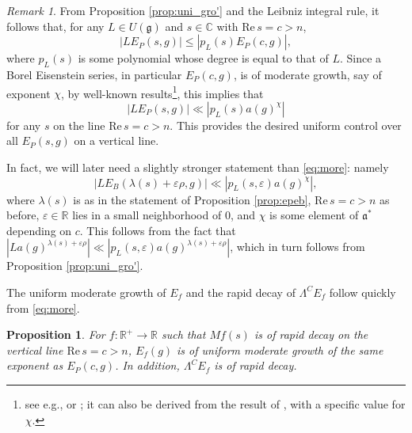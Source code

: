 \documentclass[11pt]{amsart}
\def\R{\mathbb{R}}
\newtheorem{proposition}[theorem]{Proposition}
\numberwithin{theorem}{section}
\numberwithin{equation}{section}
\theoremstyle{remark}
\newtheorem*{remark}{Remark}
\theoremstyle{definition}
\newcommand{\C}{\mathbb{C}}
\newcommand{\re}{\mathrm{Re}\,}
\newcommand{\ga}{\mathfrak{a}}
\newcommand{\Lg}{\mathfrak{g}}
\begin{document}
\begin{remark}
From Proposition \ref{prop:uni_gro'} and the Leibniz integral rule, it follows that, for any $L \in U(\Lg)$ and $s \in \C$ with $\re s = c > n$,
\begin{equation*}
|LE_P(s,g)| \leq |p_L(s)E_P(c,g)|,
\end{equation*}
where $p_L(s)$ is some polynomial whose degree is equal to that of $L$. Since a Borel Eisenstein series, in particular $E_P(c,g)$, is of moderate growth, say of exponent $\chi$, by well-known results\footnote{see e.g., \cite[I.2.17]{MW95} or \cite[Appendix A]{GMP17}; it can also be derived from the result of \cite{Kim23}, with a specific value for $\chi$.}, this implies that
\begin{equation}\label{eq:more}
|LE_P(s,g)| \ll |p_L(s)a(g)^\chi|
\end{equation}
for any $s$ on the line $\re s = c > n$. This provides the desired uniform control over all $E_P(s,g)$ on a vertical line.

In fact, we will later need a slightly stronger statement than \eqref{eq:more}: namely
\begin{equation}\label{eq:more2}
|LE_B(\lambda(s)+\varepsilon\rho,g)| \ll |p_L(s,\varepsilon)a(g)^\chi|,
\end{equation}
where $\lambda(s)$ is as in the statement of Proposition \ref{prop:epeb}, $\re s = c > n$ as before, $\varepsilon \in \R$ lies in a small neighborhood of $0$, and $\chi$ is some element of $\ga^*$ depending on $c$. This follows from the fact that $|La(g)^{\lambda(s)+\varepsilon\rho}| \ll |p_L(s,\varepsilon)a(g)^{\lambda(s)+\varepsilon\rho}|$, which in turn follows from Proposition \ref{prop:uni_gro'}.
\end{remark}


The uniform moderate growth of $E_f$ and the rapid decay of $\Lambda^CE_f$ follow quickly from \eqref{eq:more}.

\begin{proposition} \label{prop:umg}
For $f:\R^+ \rightarrow \R$ such that $Mf(s)$ is of rapid decay on the vertical line $\re s = c > n$, $E_f(g)$ is of uniform moderate growth of the same exponent as $E_P(c,g)$. In addition, $\Lambda^CE_f$ is of rapid decay.
\end{proposition}

\end{document}
